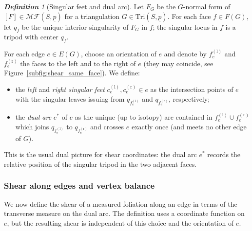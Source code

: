 \documentclass[11pt, letterpaper]{amsart}
\theoremstyle{definition}
\theoremstyle{remark}
\newtheorem{definition}[theorem]{\rm\bf Definition}
\newcommand{\up}{\underline{p}}
\newcommand{\Sp}{(S,\up)}
\newcommand{\TSp}{\text{Tri}\Sp}
\newcommand{\cMFp}{\mathcal{MF} (S,\up)}
\newcommand{\DEF}{} \newcommand{\WARN}{\textcolor{red}} \newcommand{\ALT}{\textcolor{brown}} \newcommand{\TODO}{\textcolor{teal}} %
\numberwithin{equation}{section}
\begin{document}
\begin{definition}[Singular feet and dual arc]
    \label{def:feet.dual.arc}
    Let \(F_G\) be the $G$-normal form of \([F]\in\cMFp\) for a triangulation \(G\in\TSp\).
    For each face \(f\in F(G)\), let \(q_f\) be the unique interior singularity of \(F_G\) in \(f\); the singular locus in \(f\) is a tripod with center \(q_f\).

    For each edge \(e\in E(G)\), choose an orientation of \(e\) and denote by \(f^{(\mathrm{l})}_e\) and \(f^{(\mathrm{r})}_e\) the faces to the left and to the right of \(e\) (they may coincide, see Figure~\ref{subfig:shear_same_face}).
    We define:
    \begin{itemize}
        \item the \DEF{\em left} and \DEF{\em right singular feet} \(c^{(\mathrm{l})}_e, c^{(\mathrm{r})}_e \in e\) as the intersection points of \(e\) with the singular leaves issuing from \(q_{f^{(\mathrm{l})}_e}\) and \(q_{f^{(\mathrm{r})}_e}\), respectively; 
        \item the \DEF{\em dual arc} \(e^*\) of \(e\) as the unique (up to isotopy) arc contained in \(f^{(\mathrm{l})}_e \cup f^{(\mathrm{r})}_e\) which joins \(q_{f^{(\mathrm{l})}_e}\) to \(q_{f^{(\mathrm{r})}_e}\) and crosses \(e\) exactly once (and meets no other edge of \(G\)).
    \end{itemize}
\end{definition}

This is the usual dual picture for shear coordinates: the dual arc \(e^*\) records the relative position of the singular tripod in the two adjacent faces.

\subsubsection{Shear along edges and vertex balance}

We now define the shear of a measured foliation along an edge in terms of the transverse measure on the dual arc.
The definition uses a coordinate function on \(e\), but the resulting shear is independent of this choice and the orientation of \(e\).
\end{document}

